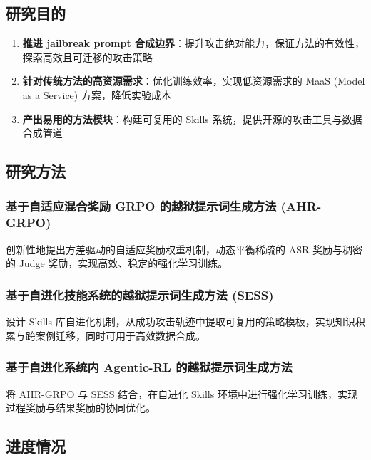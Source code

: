 \documentclass[12pt,a4paper]{article}
\newcommand{\highlight}[1]{\textcolor{primaryblue}{\textbf{#1}}}
\begin{document}
\subsection{研究目的}

\begin{enumerate}
    \item \highlight{推进 jailbreak prompt 合成边界}：提升攻击绝对能力，保证方法的有效性，探索高效且可迁移的攻击策略
    \item \highlight{针对传统方法的高资源需求}：优化训练效率，实现低资源需求的 MaaS (Model as a Service) 方案，降低实验成本
    \item \highlight{产出易用的方法模块}：构建可复用的 Skills 系统，提供开源的攻击工具与数据合成管道
\end{enumerate}

\subsection{研究方法}

\subsubsection{基于自适应混合奖励 GRPO 的越狱提示词生成方法 (AHR-GRPO)}

创新性地提出方差驱动的自适应奖励权重机制，动态平衡稀疏的 ASR 奖励与稠密的 Judge 奖励，实现高效、稳定的强化学习训练。

\subsubsection{基于自进化技能系统的越狱提示词生成方法 (SESS)}

设计 Skills 库自进化机制，从成功攻击轨迹中提取可复用的策略模板，实现知识积累与跨案例迁移，同时可用于高效数据合成。

\subsubsection{基于自进化系统内 Agentic-RL 的越狱提示词生成方法}

将 AHR-GRPO 与 SESS 结合，在自进化 Skills 环境中进行强化学习训练，实现过程奖励与结果奖励的协同优化。

\subsection{进度情况}
\end{document}
